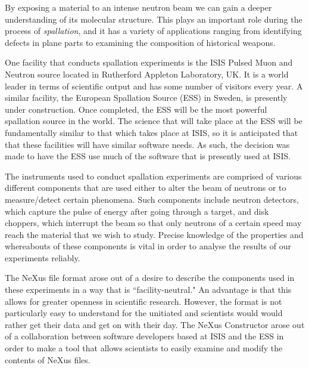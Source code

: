 By exposing a material to an intense neutron beam we can gain a deeper understanding of its molecular structure. This plays an important role during the process of \textit{spallation}, and it has a variety of applications ranging from identifying defects in plane parts to examining the composition of historical weapons. 

One facility that conducts spallation experiments is the ISIS Pulsed Muon and Neutron source located in Rutherford Appleton Laboratory, UK. It is a world leader in terms of scientific output and has some number of visitors every year. A similar facility, the European Spallation Source (ESS) in Sweden, is presently under construction. Once completed, the ESS will be the most powerful spallation source in the world. The science that will take place at the ESS will be fundamentally similar to that which takes place at ISIS, so it is anticipated that that these facilities will have similar software needs. As such, the decision was made to have the ESS use much of the software that is presently used at ISIS.

The instruments used to conduct spallation experiments are comprised of various different components that are used either to alter the beam of neutrons or to measure/detect certain phenomena. Such components include neutron detectors, which capture the pulse of energy after going through a target, and disk choppers, which interrupt the beam so that only neutrons of a certain speed may reach the material that we wish to study. Precise knowledge of the properties and whereabouts of these components is vital in order to analyse the results of our experiments reliably. 

The NeXus file format arose out of a desire to describe the components used in these experiments in a way that is ``facility-neutral." An advantage is that this allows for greater openness in scientific research. However, the format is not particularly easy to understand for the unitiated and scientists would would rather get their data and get on with their day. The NeXus Constructor arose out of a collaboration between software developers based at ISIS and the ESS in order to make a tool that allows scientists to easily examine and modify the contents of NeXus files.
